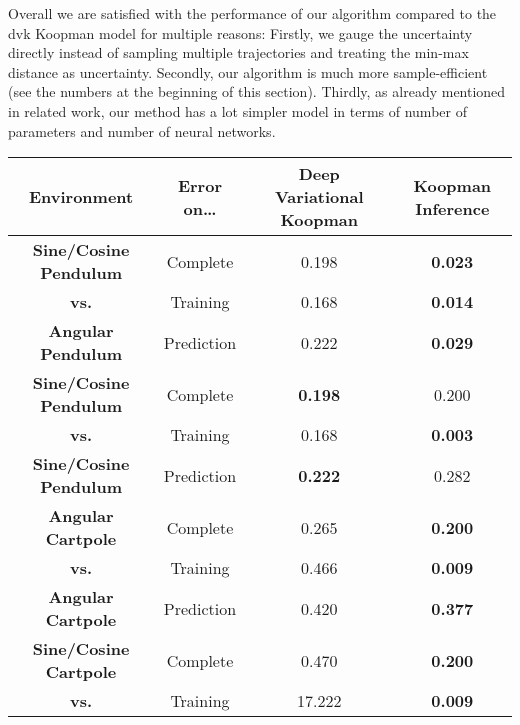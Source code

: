 		Overall we are satisfied with the performance of our algorithm compared to the \ac{dvk} Koopman model for multiple reasons: Firstly, we gauge the uncertainty directly instead of sampling multiple trajectories and treating the min-max distance as uncertainty. Secondly, our algorithm is much more sample-efficient (see the numbers at the beginning of this section). Thirdly, as already mentioned in related work, our method has a lot simpler model in terms of number of parameters and number of neural networks.

		\begin{table}
			\centering
			\begin{tabular}{c|c|c|c}
				    \textbf{Environment}      & \textbf{Error on}\dots & \textbf{Deep Variational Koopman} & \textbf{Koopman Inference} \\ \hline
				\textbf{Sine/Cosine Pendulum} &        Complete        &               0.198               &       \textbf{0.023}       \\
				        \textbf{vs.}          &        Training        &               0.168               &       \textbf{0.014}       \\
				  \textbf{Angular Pendulum}   &       Prediction       &               0.222               &       \textbf{0.029}       \\ \hline
				\textbf{Sine/Cosine Pendulum} &        Complete        &          \textbf{0.198}           &           0.200            \\
				        \textbf{vs.}          &        Training        &               0.168               &       \textbf{0.003}       \\
				\textbf{Sine/Cosine Pendulum} &       Prediction       &          \textbf{0.222}           &           0.282            \\ \hline
				  \textbf{Angular Cartpole}   &        Complete        &               0.265               &       \textbf{0.200}       \\
				        \textbf{vs.}          &        Training        &               0.466               &       \textbf{0.009}       \\
				  \textbf{Angular Cartpole}   &       Prediction       &               0.420               &       \textbf{0.377}       \\ \hline
				\textbf{Sine/Cosine Cartpole} &        Complete        &               0.470               &       \textbf{0.200}       \\
				        \textbf{vs.}          &        Training        &              17.222               &       \textbf{0.009}       \\

\end{tabular}
\end{table}
